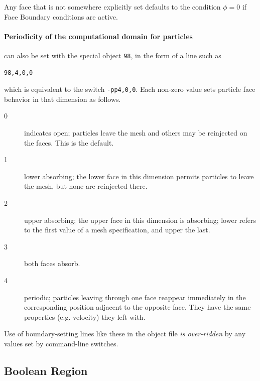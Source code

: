 \documentclass[12pt]{article}
\begin{document}
Any face that is not somewhere explicitly set defaults to the
condition $\phi=0$ if Face Boundary conditions are active.

\paragraph{Periodicity of the computational domain for
  particles}\label{partperiod} can
also be set with the special object \verb!98!, in the form of a line
such as
\begin{verbatim}
98,4,0,0
\end{verbatim} which is equivalent to the switch \verb!-pp4,0,0!.
Each non-zero value sets particle face behavior in that dimension as follows.

\begin{description}
\item[0]  indicates open; particles leave the mesh and others may be
reinjected on the faces. This is the default. 
\item[1] lower absorbing; the lower face in this dimension permits particles
to leave the mesh, but none are reinjected there.
\item[2] upper absorbing; the upper face in this dimension is absorbing;
lower refers to the first value of a mesh specification, and upper the
last.
\item[3] both faces absorb.
\item[4] periodic; particles leaving through one face reappear immediately in the
corresponding position adjacent to the opposite face. They have the same
properties (e.g. velocity) they left with.
\end{description}

Use of boundary-setting lines like these in the object file
\emph{is over-ridden} by any values set by command-line switches.

\subsection{Boolean Region}
\end{document}
